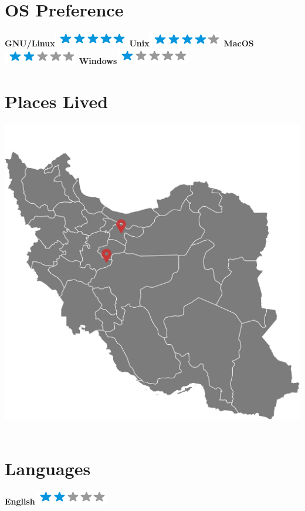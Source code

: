 \documentclass[a4paper]{friggeri-cv}
\begin{document}
\begin{aside}
~
~
~
  \section{OS Preference}
    \textbf{GNU/Linux}\includegraphics[scale=0.40]{img/5stars.png}
    \textbf{Unix}\includegraphics[scale=0.40]{img/4stars.png}
    \textbf{MacOS}\includegraphics[scale=0.40]{img/2stars.png}
    \textbf{Windows}\includegraphics[scale=0.40]{img/1stars.png}
    ~
  \section{Places Lived}
    \includegraphics[scale=0.7]{img/iran.png}
    ~
  \section{Languages}
    \textbf{English}\includegraphics[scale=0.40]{img/2stars.png}
    ~
\end{aside}
\end{document}
